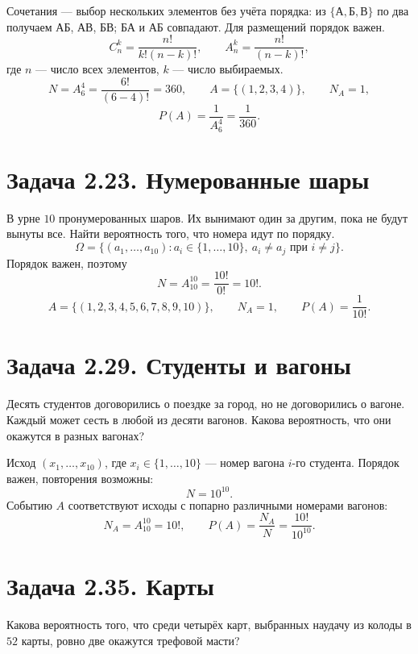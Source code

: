 Сочетания --- выбор нескольких элементов без учёта порядка:
из $\{\text{А},\text{Б},\text{В}\}$ по два получаем АБ, АВ, БВ; БА и АБ совпадают.
Для размещений порядок важен.
\[
 C_n^k=\frac{n!}{k!(n-k)!},\qquad A_n^k=\frac{n!}{(n-k)!},
\]
где $n$ --- число всех элементов, $k$ --- число выбираемых.
\[
 N=A_6^4=\frac{6!}{(6-4)!}=360,
 \qquad A=\{(1,2,3,4)\},\qquad N_A=1,
\]
\[
 P(A)=\frac1{A_6^4}=\frac1{360}.
\]

\section*{Задача 2.23. Нумерованные шары}
В урне $10$ пронумерованных шаров. Их вынимают один за другим, пока
не будут вынуты все. Найти вероятность того, что номера идут по порядку.
\[
 \Omega=\{(a_1,\ldots,a_{10}):a_i\in\{1,\ldots,10\},\
 a_i\ne a_j\text{ при }i\ne j\}.
\]
Порядок важен, поэтому
\[
 N=A_{10}^{10}=\frac{10!}{0!}=10!.
\]
\[
 A=\{(1,2,3,4,5,6,7,8,9,10)\},\qquad N_A=1,
 \qquad P(A)=\frac1{10!}.
\]

\section*{Задача 2.29. Студенты и вагоны}
Десять студентов договорились о поездке за город, но не договорились о вагоне.
Каждый может сесть в любой из десяти вагонов. Какова вероятность,
что они окажутся в разных вагонах?

Исход $(x_1,\ldots,x_{10})$, где $x_i\in\{1,\ldots,10\}$ ---
номер вагона $i$-го студента. Порядок важен, повторения возможны:
\[
 N=10^{10}.
\]
Событию $A$ соответствуют исходы с попарно различными номерами вагонов:
\[
 N_A=A_{10}^{10}=10!,\qquad
 P(A)=\frac{N_A}{N}=\frac{10!}{10^{10}}.
\]

\section*{Задача 2.35. Карты}
Какова вероятность того, что среди четырёх карт, выбранных наудачу
из колоды в $52$ карты, ровно две окажутся трефовой масти?



